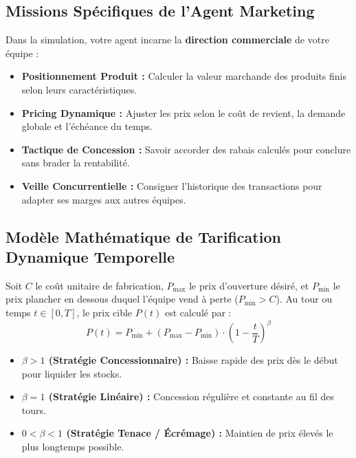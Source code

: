\documentclass[11pt,a4paper]{article}
\begin{document}
\subsection{Missions Spécifiques de l'Agent Marketing}
Dans la simulation, votre agent incarne la \textbf{direction commerciale} de votre équipe :
\begin{itemize}[leftmargin=*, itemsep=2pt]
    \item \textbf{Positionnement Produit :} Calculer la valeur marchande des produits finis selon leurs caractéristiques.
    \item \textbf{Pricing Dynamique :} Ajuster les prix selon le coût de revient, la demande globale et l'échéance du temps.
    \item \textbf{Tactique de Concession :} Savoir accorder des rabais calculés pour conclure sans brader la rentabilité.
    \item \textbf{Veille Concurrentielle :} Consigner l'historique des transactions pour adapter ses marges aux autres équipes.
\end{itemize}

\subsection{Modèle Mathématique de Tarification Dynamique Temporelle}
Soit $C$ le coût unitaire de fabrication, $P_{\max}$ le prix d'ouverture désiré, et $P_{\min}$ le prix plancher en dessous duquel l'équipe vend à perte ($P_{\min} > C$). Au tour ou temps $t \in [0, T]$, le prix cible $P(t)$ est calculé par :
\begin{equation}
P(t) = P_{\min} + (P_{\max} - P_{\min}) \cdot \left(1 - \frac{t}{T}\right)^{\beta}
\end{equation}
\begin{itemize}[leftmargin=*, itemsep=2pt]
    \item \textbf{$\beta > 1$ (Stratégie Concessionnaire) :} Baisse rapide des prix dès le début pour liquider les stocks.
    \item \textbf{$\beta = 1$ (Stratégie Linéaire) :} Concession régulière et constante au fil des tours.
    \item \textbf{$0 < \beta < 1$ (Stratégie Tenace / Écrémage) :} Maintien de prix élevés le plus longtemps possible.
\end{itemize}
\end{document}
